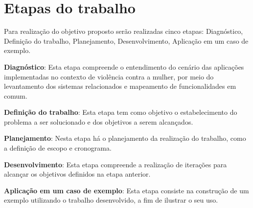 \section{Etapas do trabalho}

Para realização do objetivo proposto serão realizadas cinco etapas: 
Diagnóstico, Definição do trabalho, Planejamento, Desenvolvimento, Aplicação em um caso de exemplo.

\noindent \textbf{Diagnóstico}: Esta etapa compreende o entendimento do cenário das aplicações implementadas no contexto
de violência contra a mulher, por meio do levantamento dos sistemas relacionados e mapeamento
de funcionalidades em comum.

\noindent \textbf{Definição do trabalho}: Esta etapa tem como objetivo o estabelecimento do problema a ser solucionado e dos objetivos a serem alcançados.

\noindent \textbf{Planejamento}: Nesta etapa há o planejamento da realização do trabalho, como a definição de escopo e cronograma.

\noindent \textbf{Desenvolvimento}: Esta etapa compreende a realização de iterações para 
alcançar os objetivos definidos na etapa anterior.

\noindent \textbf{Aplicação em um caso de exemplo}: Esta etapa consiste na construção de um exemplo utilizando o
trabalho desenvolvido, a fim de ilustrar o seu uso.








